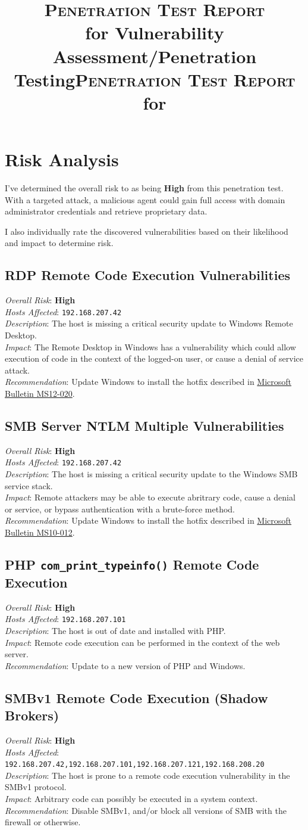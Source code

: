 \documentclass[12pt,titlepage]{article}
\title{\vfill\vfill\textsc{Penetration Test Report}\\\large{for Vulnerability Assessment/Penetration Testing}}
\title{\vfill\vfill\textsc{Penetration Test Report}\\%
\large{for \theclient{}}}
\author{\thecompany}
\def\theclient{}
\newcommand{\vulnnote}[2]{\noindent \textit{#1}: #2\\}
\newcommand{\risk}[1]{\vulnnote{Overall Risk}{\textbf{#1}}}
\newcommand{\descr}[1]{\vulnnote{Description}{#1}}
\newcommand{\impact}[1]{\vulnnote{Impact}{#1}}
\newcommand{\recommend}[1]{\vulnnote{Recommendation}{#1}}
\newcommand{\hosts}[1]{\vulnnote{Hosts Affected}{\texttt{#1}}}
\newenvironment{vuln}[1]{\subsection{#1}}{}
\newcommand{\msbulletin}[1]{\href{http://technet.microsoft.com/en-us/security/bulletin/#1}{Microsoft Bulletin \MakeTextUppercase{#1}}}
\begin{document}
\maketitle

\tableofcontents
\clearpage
{}
\setcounter{page}{1}

\section{Risk Analysis}

I've determined the overall risk to \theclient{} as being \textbf{High} from this penetration test.
With a targeted attack, a malicious agent could gain full access with domain administrator credentials and retrieve proprietary data.

I also individually rate the discovered vulnerabilities based on their likelihood and impact to determine risk.

\begin{vuln}{RDP Remote Code Execution Vulnerabilities}
\risk{High}
\hosts{192.168.207.42}
\descr{The host is missing a critical security update to Windows Remote Desktop.}
\impact{The Remote Desktop in Windows has a vulnerability which could allow execution of code in the context of the logged-on user, or cause a denial of service attack.}
\recommend{Update Windows to install the hotfix described in \msbulletin{ms12-020}.}
\end{vuln}

\begin{vuln}{SMB Server NTLM Multiple Vulnerabilities}
\risk{High}
\hosts{192.168.207.42}
\descr{The host is missing a critical security update to the Windows SMB service stack.}
\impact{Remote attackers may be able to execute abritrary code, cause a denial or service, or bypass authentication with a brute-force method.}
\recommend{Update Windows to install the hotfix described in \msbulletin{ms10-012}.}
\end{vuln}

\begin{vuln}{PHP \texttt{com\_print\_typeinfo()} Remote Code Execution}
\risk{High}
\hosts{192.168.207.101}
\descr{The host is out of date and installed with PHP.}
\impact{Remote code execution can be performed in the context of the web server.}
\recommend{Update to a new version of PHP and Windows.}
\end{vuln}

\begin{vuln}{SMBv1 Remote Code Execution (Shadow Brokers)}
\risk{High}
\hosts{192.168.207.42,192.168.207.101,192.168.207.121,192.168.208.20}
\descr{The host is prone to a remote code execution vulnerability in the SMBv1 protocol.}
\impact{Arbitrary code can possibly be executed in a system context.}
\recommend{Disable SMBv1, and/or block all versions of SMB with the firewall or otherwise.}
\end{vuln}
\end{document}
